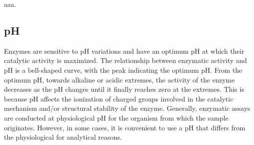 \documentclass[
  9pt,
  american,
  a5paper,
  extrafontsizes,onecolumn,openright
  ]{memoir}
\begin{document}
aaa.

\subsection{pH}\label{ph}

Enzymes are sensitive to pH variations and have an optimum pH at which their catalytic activity is maximized. The relationship between enzymatic activity and pH is a bell-shaped curve, with the peak indicating the optimum pH. From the optimum pH, towards alkaline or acidic extremes, the activity of the enzyme decreases as the pH changes until it finally reaches zero at the extremes. This is because pH affects the ionization of charged groups involved in the catalytic mechanism and/or structural stability of the enzyme. Generally, enzymatic assays are conducted at physiological pH for the organism from which the sample originates. However, in some cases, it is convenient to use a pH that differs from the physiological for analytical reasons.
\end{document}
